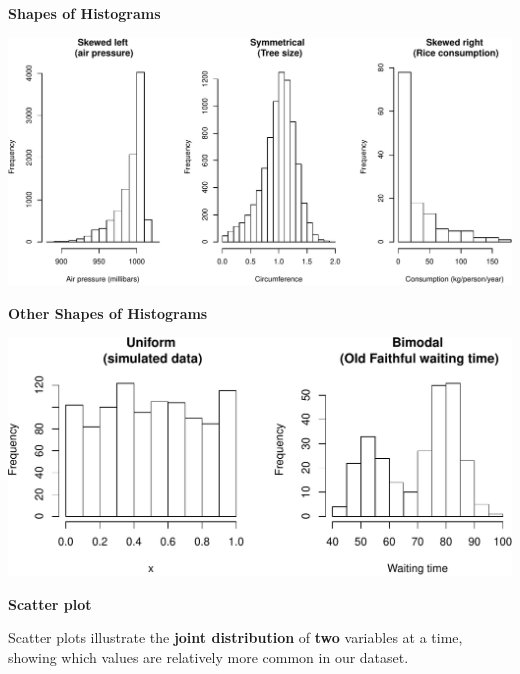 \documentclass[ignorenonframetext,]{beamer}
\begin{document}
\begin{frame}{}
\protect\hypertarget{section-14}{}

\textbf{\large Shapes of Histograms}

\vspace{1ex}\scriptsize

\includegraphics{lecture-03_files/figure-beamer/unnamed-chunk-7-1.pdf}

\end{frame}

\begin{frame}{}
\protect\hypertarget{section-15}{}

\textbf{\large Other Shapes of Histograms}

\vspace{1ex}\scriptsize

\includegraphics{lecture-03_files/figure-beamer/unnamed-chunk-8-1.pdf}

\end{frame}

\begin{frame}{}
\protect\hypertarget{section-16}{}

\textbf{\large Scatter plot}

Scatter plots illustrate the \textbf{joint distribution} of \textbf{two}
variables at a time, showing which values are relatively more common in
our dataset.

\end{frame}
\end{document}
